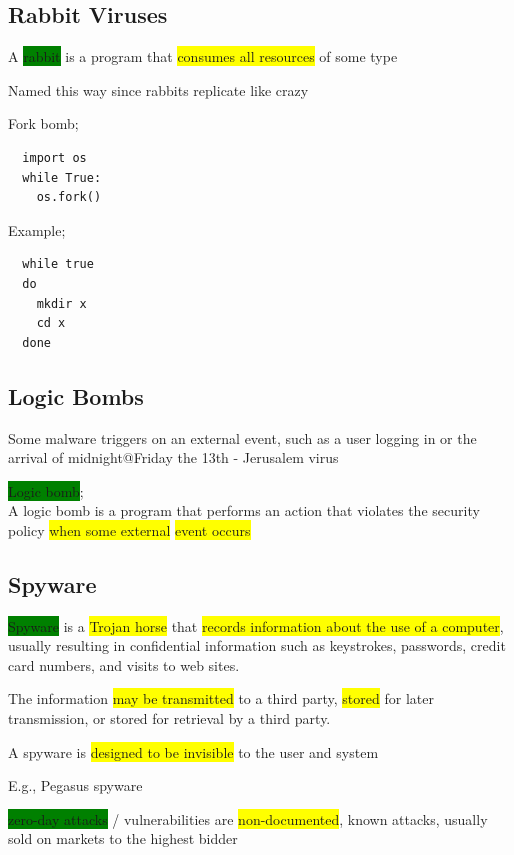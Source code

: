 \documentclass[]{project_plan}
\begin{document}
\subsection{Rabbit Viruses}
A \colorbox{green}{rabbit} is a program that \colorbox{yellow}{consumes all resources} of some type

Named this way since rabbits replicate like crazy

Fork bomb;
\begin{lstlisting}
  import os
  while True:
    os.fork()
\end{lstlisting}

Example;
\begin{lstlisting}
  while true
  do
    mkdir x
    cd x
  done
\end{lstlisting}

\subsection{Logic Bombs}

Some malware triggers on an external event, such as a user logging in or the arrival of midnight@Friday
the 13th - Jerusalem virus

\colorbox{green}{Logic bomb};\\
A logic bomb is a program that performs an action that violates the security policy \colorbox{yellow}{when some
  external} \colorbox{yellow}{event occurs}

\subsection{Spyware}

\colorbox{green}{Spyware} is a \colorbox{yellow}{Trojan horse} that \colorbox{yellow}{records information about the use of a computer},
usually resulting in confidential information such as keystrokes, passwords, credit card numbers, and
visits to web sites.

The information \colorbox{yellow}{may be transmitted} to a third party, \colorbox{yellow}{stored} for later transmission,
or stored for retrieval by a third party.

A spyware is \colorbox{yellow}{designed to be invisible} to the user and system

E.g., Pegasus spyware

\colorbox{green}{zero-day attacks} / vulnerabilities are \colorbox{yellow}{non-documented}, known attacks, usually
sold on markets to the highest bidder
\end{document}
